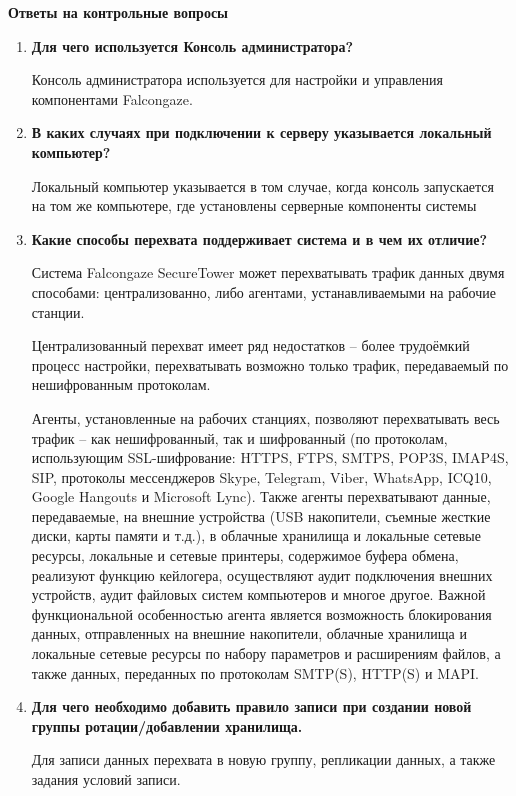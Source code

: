 \documentclass[a4paper,14pt]{extarticle}
\begin{document}
    \newpage
    \textbf{Ответы на контрольные вопросы}
    \begin{enumerate}
        \item \textbf{Для чего используется Консоль администратора?} \par
        \qquad Консоль администратора используется для настройки и управления
        компонентами Falcongaze.  
        \item \textbf{В каких случаях при подключении к серверу указывается локальный компьютер?} \par
        \qquad Локальный компьютер указывается в том случае, когда консоль запускается на том же 
        компьютере, где установлены серверные компоненты системы
        \item \textbf{Какие способы перехвата поддерживает система и в чем их отличие?}\par
        \qquad Система Falcongaze SecureTower может перехватывать трафик данных двумя способами: централизованно, либо агентами, устанавливаемыми на рабочие станции.\par
        \qquad Централизованный перехват имеет ряд недостатков – более трудоёмкий процесс настройки, перехватывать возможно только трафик, передаваемый по нешифрованным протоколам. \par
        \qquad Агенты, установленные на рабочих станциях, позволяют перехватывать весь трафик – как нешифрованный, так и шифрованный (по протоколам, использующим SSL-шифрование: HTTPS, FTPS, SMTPS, POP3S, IMAP4S, SIP, протоколы мессенджеров Skype, Telegram, Viber, WhatsApp, ICQ10, Google Hangouts и Microsoft Lync). Также агенты перехватывают данные, передаваемые, на внешние устройства (USB накопители, съемные жесткие диски, карты памяти и т.д.), в облачные хранилища и локальные сетевые ресурсы, локальные и сетевые принтеры, содержимое буфера обмена, реализуют функцию кейлогера, осуществляют аудит подключения внешних устройств, аудит файловых систем компьютеров и многое другое. Важной функциональной особенностью агента является возможность блокирования данных, отправленных на внешние накопители, облачные хранилища и локальные сетевые ресурсы по набору параметров и расширениям файлов, а также данных, переданных по протоколам SMTP(S), HTTP(S) и MAPI.
        \item \textbf{Для чего необходимо добавить правило записи при создании новой группы ротации/добавлении хранилища.} \par
        \qquad Для записи данных перехвата в новую группу, репликации данных, а также задания условий записи.

\end{enumerate}
\end{document}
